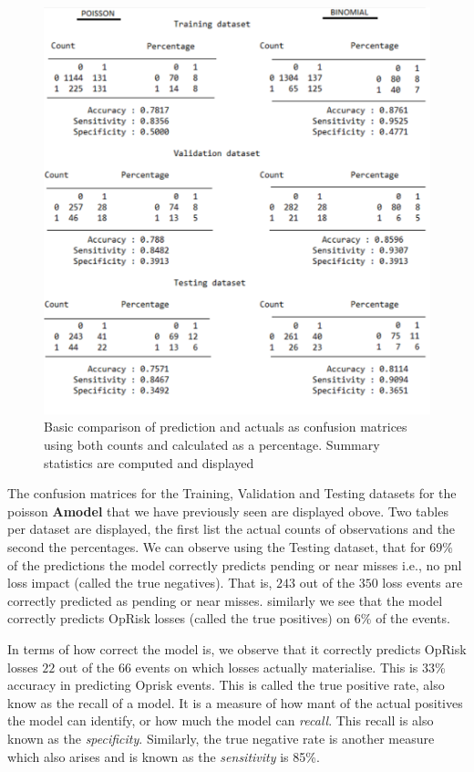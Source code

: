 \documentclass{DissertateUSU}
\begin{document}
\begin{figure}
\centering
\includegraphics[scale=1.0]{ConfusionMatrix.pdf}
\caption[Confusion (Error) matrices]{Basic comparison of prediction and actuals as confusion matrices using both counts and calculated as a percentage. Summary statistics are computed and displayed}
\label{ConfusionMatricesAll}
\end{figure}

The confusion matrices for the Training, Validation and Testing datasets
for the poisson \textbf{Amodel} that we have previously seen are
displayed obove. Two tables per dataset are displayed, the first list
the actual counts of observations and the second the percentages. We can
observe using the Testing dataset, that for \(69\)\% of the predictions
the model correctly predicts pending or near misses i.e., no pnl loss
impact (called the true negatives). That is, \(243\) out of the \(350\)
loss events are correctly predicted as pending or near misses. similarly
we see that the model correctly predicts OpRisk losses (called the true
positives) on \(6\)\% of the events.\medskip

In terms of how correct the model is, we observe that it correctly
predicts OpRisk losses \(22\) out of the \(66\) events on which losses
actually materialise. This is \(33\)\% accuracy in predicting Oprisk
events. This is called the true positive rate, also know as the recall
of a model. It is a measure of how mant of the actual positives the
model can identify, or how much the model can \emph{recall}. This recall
is also known as the \emph{specificity}. Similarly, the true negative
rate is another measure which also arises and is known as the
\emph{sensitivity} is 85\%.\medskip
\end{document}

